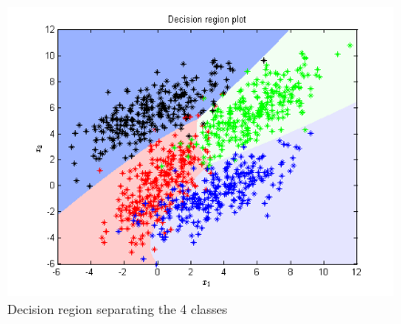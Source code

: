 \documentclass{article}
\begin{document}
\begin{figure}[H]
\centering
\includegraphics[width=\linewidth]{Classification/overlapping/decn_region_bayes.png}
\caption{Decision region separating the 4 classes}
\end{figure}
\end{document}
